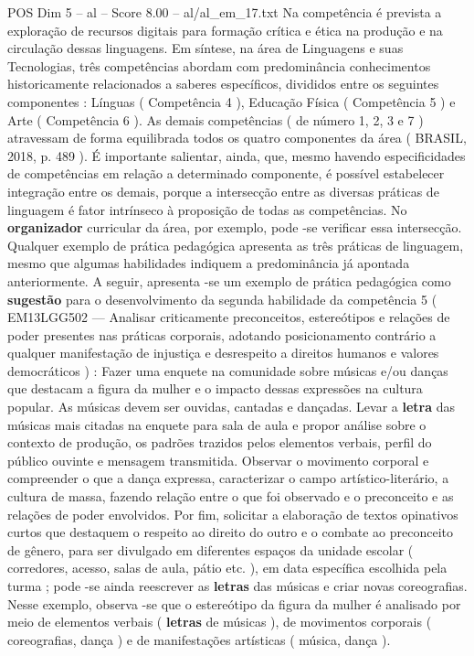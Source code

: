 \begin{textsample}{POS Dim 5 – al – Score 8.00 – al/al\_em\_17.txt}
Na competência é prevista a exploração de recursos digitais para formação crítica e ética na produção e na circulação dessas linguagens.
Em síntese, na área de Linguagens e suas Tecnologias, três competências abordam com predominância conhecimentos historicamente relacionados a saberes específicos, divididos entre os seguintes componentes : Línguas ( Competência 4 ), Educação Física ( Competência 5 ) e Arte ( Competência 6 ).
As demais competências ( de número 1, 2, 3 e 7 ) atravessam de forma equilibrada todos os quatro componentes da área ( BRASIL, 2018, p. 489 ).
É importante salientar, ainda, que, mesmo havendo especificidades de competências em relação a determinado componente, é possível estabelecer integração entre os demais, porque a intersecção entre as diversas práticas de linguagem é fator intrínseco à proposição de todas as competências.
No \textbf{organizador} curricular da área, por exemplo, pode -se verificar essa intersecção.
Qualquer exemplo de prática pedagógica apresenta as três práticas de linguagem, mesmo que algumas habilidades indiquem a predominância já apontada anteriormente.
A seguir, apresenta -se um exemplo de prática pedagógica como \textbf{sugestão} para o desenvolvimento da segunda habilidade da competência 5 ( EM13LGG502 — Analisar criticamente preconceitos, estereótipos e relações de poder presentes nas práticas corporais, adotando posicionamento contrário a qualquer manifestação de injustiça e desrespeito a direitos humanos e valores democráticos ) : Fazer uma enquete na comunidade sobre músicas e/ou danças que destacam a figura da mulher e o impacto dessas expressões na cultura popular.
As músicas devem ser ouvidas, cantadas e dançadas.
Levar a \textbf{letra} das músicas mais citadas na enquete para sala de aula e propor análise sobre o contexto de produção, os padrões trazidos pelos elementos verbais, perfil do público ouvinte e mensagem transmitida.
Observar o movimento corporal e compreender o que a dança expressa, caracterizar o campo artístico-literário, a cultura de massa, fazendo relação entre o que foi observado e o preconceito e as relações de poder envolvidos.
Por fim, solicitar a elaboração de textos opinativos curtos que destaquem o respeito ao direito do outro e o combate ao preconceito de gênero, para ser divulgado em diferentes espaços da unidade escolar ( corredores, acesso, salas de aula, pátio etc. ), em data específica escolhida pela turma ; pode -se ainda reescrever as \textbf{letras} das músicas e criar novas coreografias.
Nesse exemplo, observa -se que o estereótipo da figura da mulher é analisado por meio de elementos verbais ( \textbf{letras} de músicas ), de movimentos corporais ( coreografias, dança ) e de manifestações artísticas ( música, dança ).

\end{textsample}

